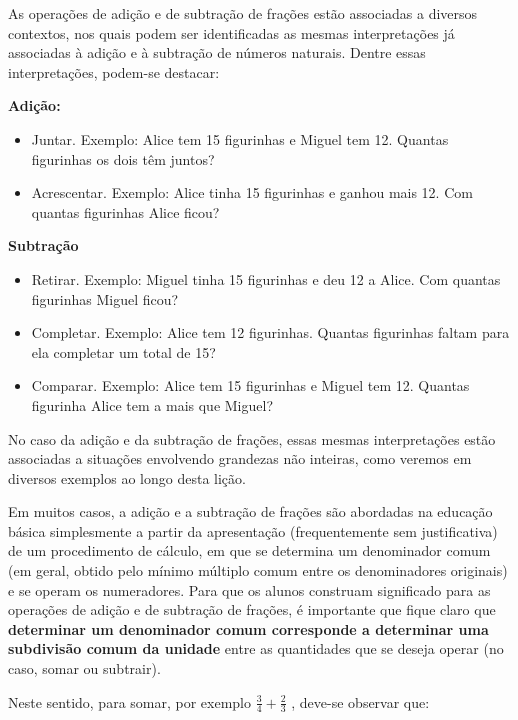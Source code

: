
\noindent {\color{special}{\Large \bf Para o professor}}
\vspace{.5cm}

  As operações de adição e de subtração de frações estão associadas a diversos contextos, nos quais podem ser identificadas as mesmas interpretações já associadas à adição e à subtração de números naturais.   
  Dentre essas interpretações, podem-se destacar:  
  
{\bf Adição:}  
\begin{itemize} %
    \item       Juntar. Exemplo: Alice tem 15 figurinhas e Miguel tem 12. Quantas figurinhas os dois têm juntos?
    \item       Acrescentar. Exemplo: Alice tinha 15 figurinhas e ganhou mais 12. Com quantas figurinhas Alice ficou?
\end{itemize} %
  
  
{\bf Subtração}  
\begin{itemize} %
    \item       Retirar. Exemplo: Miguel tinha 15 figurinhas e deu 12 a Alice. Com quantas figurinhas Miguel ficou?
    \item       Completar. Exemplo: Alice tem 12 figurinhas. Quantas figurinhas faltam para ela completar um total de 15?
    \item       Comparar. Exemplo: Alice tem 15 figurinhas e Miguel tem 12. Quantas figurinha Alice tem a mais que Miguel?
\end{itemize} %
  
  
  No caso da adição e da subtração de frações, essas mesmas interpretações estão associadas a situações envolvendo grandezas não inteiras, como veremos em diversos exemplos ao longo desta lição.  
  
  Em muitos casos, a adição e a subtração de frações são abordadas na educação básica simplesmente a partir da apresentação (frequentemente sem justificativa) de um procedimento de cálculo, em que se determina um denominador comum (em geral, obtido pelo mínimo múltiplo comum entre os denominadores originais) e se operam os numeradores. Para que os alunos construam significado para as operações de adição e de subtração de frações, é importante que fique claro que   {\bf determinar um denominador comum corresponde a determinar uma subdivisão comum da unidade}   entre as quantidades que se deseja operar (no caso, somar ou subtrair).  
  
  Neste sentido, para somar, por exemplo   $\frac{3}{4} + \frac{2}{3}$  , deve-se observar que:  
  
